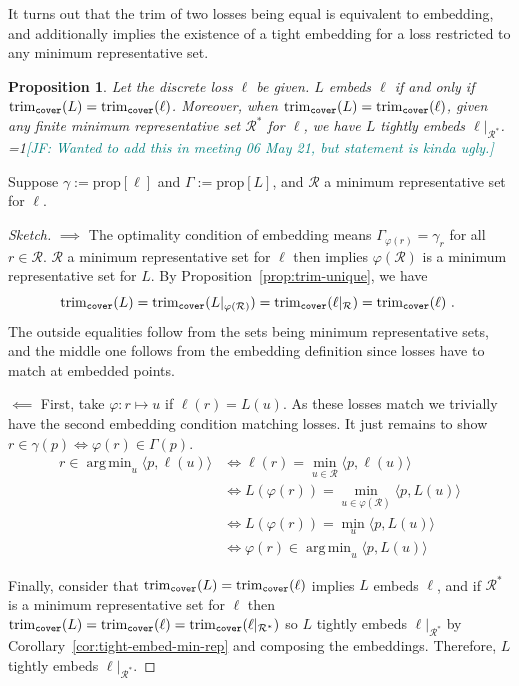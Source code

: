 \documentclass[11pt]{article}
\newcommand{\Comments}{1}
\newcommand{\mynote}[2]{\ifnum\Comments=1\textcolor{#1}{#2}\fi}
\newcommand{\jessie}[1]{\mynote{teal}{[JF: #1]}}
\newcommand{\prop}[1]{\mathrm{prop}[#1]}
\newcommand{\R}{\mathcal{R}}
\newcommand{\inprod}[2]{\langle #1, #2 \rangle}%
\newcommand{\trim}{\mathrm{trim}}
\newcommand{\trimcover}{\mathrm{trim}_{\tt cover}}
\DeclareMathOperator*{\argmin}{arg\,min}
\newtheorem{proposition}{Proposition}
\begin{document}
It turns out that the $\trim$ of two losses being equal is equivalent to embedding, and additionally implies the existence of a tight embedding for a loss restricted to any minimum representative set.

\begin{proposition}\label{prop:embed-iff-trims-equal}
  Let the discrete loss $\ell$ be given.
  $L$ embeds $\ell$ if and only if $\trimcover(L) = \trimcover(\ell)$.
  Moreover, when $\trimcover(L) = \trimcover(\ell)$, given any finite minimum representative set $\R^*$ for $\ell$, we have $L$ tightly embeds $\ell|_{\R^*}$. \jessie{Wanted to add this in meeting 06 May 21, but statement is kinda ugly.}
\end{proposition}
Suppose $\gamma := \prop{\ell}$ and $\Gamma := \prop{L}$, and $\R$ a minimum representative set for $\ell$.
\begin{proof}[Sketch]
  $\implies$
  The optimality condition of embedding means $\Gamma_{\varphi(r)} = \gamma_r$ for all $r \in \R$.
  $\R$ a minimum representative set for $\ell$ then implies $\varphi(\R)$ is a minimum representative set for $L$.
  By Proposition~\ref{prop:trim-unique}, we have
  \begin{equation*}
    \trimcover(L) = \trimcover(L|_{\varphi(\R)}) = \trimcover(\ell|_\R) = \trimcover(\ell)~.~
  \end{equation*}
  The outside equalities follow from the sets being minimum representative sets, and the middle one follows from the embedding definition since losses have to match at embedded points.
  
  $\impliedby$
  First, take $\varphi: r \mapsto u$ if $\ell(r) = L(u)$.
  As these losses match we trivially have the second embedding condition matching losses.
  It just remains to show $r \in \gamma(p) \iff \varphi(r) \in \Gamma(p)$.
  \begin{align*}
    r \in \argmin_u \inprod{p}{\ell(u)} &\iff \ell(r) = \min_{u \in \R} \inprod{p}{\ell(u)} \\
                                        &\iff L(\varphi(r)) = \min_{u \in \varphi(\R)} \inprod{p}{L(u)} \\
                                        &\iff L(\varphi(r)) = \min_u \inprod{p}{L(u)} \\
                                        &\iff \varphi(r) \in \argmin_{u} \inprod{p}{L(u)}
  \end{align*}
  
  Finally, consider that $\trimcover(L) = \trimcover(\ell)$ implies $L$ embeds $\ell$, and if $\R^*$ is a minimum representative set for $\ell$ then $\trimcover(L) = \trimcover(\ell) = \trimcover(\ell|_{\R^*})$ so $L$ tightly embeds $\ell|_{\R^*}$ by Corollary~\ref{cor:tight-embed-min-rep} and composing the embeddings.
  Therefore, $L$ tightly embeds $\ell|_{\R^*}$.
\end{proof}
\end{document}
